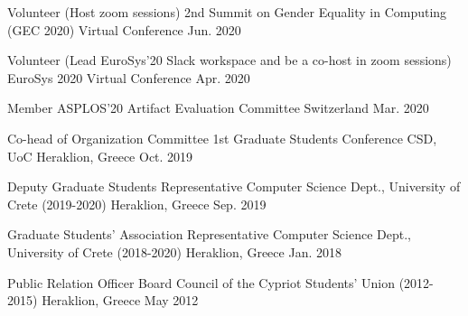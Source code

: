 \begin{cvhonors}
	\cvhonor
	{Volunteer (Host zoom sessions)} %
	{2nd Summit on Gender Equality in Computing (GEC 2020)} %
	{Virtual Conference} %
	{Jun. 2020} %


	\cvhonor
	{Volunteer (Lead EuroSys'20 Slack workspace and be a co-host in
		zoom sessions)} %
	{EuroSys 2020} %
	{Virtual Conference} %
	{Apr. 2020} %


	\cvhonor
	{Member} %
	{ASPLOS'20 Artifact Evaluation Committee} %
	{Switzerland} %
	{Mar. 2020} %

	\cvhonor
	{Co-head of Organization Committee} %
	{1st Graduate Students Conference CSD, UoC} %
	{Heraklion, Greece} %
	{Oct. 2019} %

	\cvhonor
	{Deputy Graduate Students Representative} %
	{Computer Science Dept., University of Crete (2019-2020)} %
	{Heraklion, Greece} %
	{Sep. 2019} %

	\cvhonor
	{Graduate Students' Association Representative} %
	{Computer Science Dept., University of Crete (2018-2020)} %
	{Heraklion, Greece} %
	{Jan. 2018} %

	\cvhonor
	{Public Relation Officer} %
	{Board Council of the Cypriot Students' Union (2012-2015)} %
	{Heraklion, Greece} %
	{May 2012} %

\end{cvhonors}

